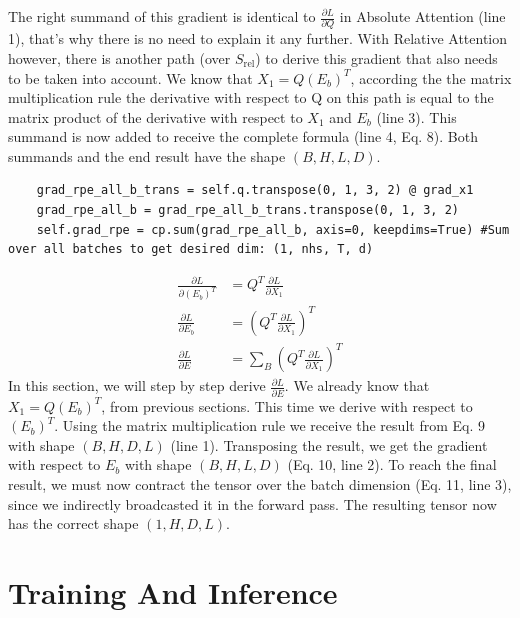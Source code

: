 \documentclass[a4paper,12pt]{extarticle}
\begin{document}
The right summand of this gradient is identical to $\frac{\partial L}{\partial Q}$ in Absolute Attention (line 1), that's why there is no need to explain it any further. With Relative Attention however, there is another path (over $S_\text{rel}$) to derive this gradient that also needs to be taken into account. We know that $X_1 = Q(E_b)^T$, according the the matrix multiplication rule the derivative with respect to Q on this path is equal to the matrix product of the derivative with respect to $X_1$ and $E_b$ (line 3). This summand is now added to receive the complete formula (line 4, Eq. 8). Both summands and the end result have the shape $(B, H, L, D)$.
\newline
\vspace{0.1cm}
\begin{lstlisting}
    grad_rpe_all_b_trans = self.q.transpose(0, 1, 3, 2) @ grad_x1
    grad_rpe_all_b = grad_rpe_all_b_trans.transpose(0, 1, 3, 2)
    self.grad_rpe = cp.sum(grad_rpe_all_b, axis=0, keepdims=True) #Sum over all batches to get desired dim: (1, nhs, T, d)
\end{lstlisting}
\begin{align}
\frac{\partial L}{\partial (E_b)^T}
&= Q^T\frac{\partial L}{\partial X_1} \\[0.2cm]
\frac{\partial L}{\partial E_b}
&= \left(Q^T\frac{\partial L}{\partial X_1}\right)^T \\[0.2cm]
\frac{\partial L}{\partial E}
&= \sum_B\left(Q^T\frac{\partial L}{\partial X_1}\right)^T
\end{align}
In this section, we will step by step derive $\frac{\partial L}{\partial E}$. We already know that  $X_1 = Q(E_b)^T$, from previous sections. This time we derive with respect to $(E_b)^T$. Using the matrix multiplication rule we receive the result from Eq. 9 with shape $(B, H, D, L)$ (line 1). Transposing the result, we get the gradient with respect to $E_b$ with shape $(B, H, L, D)$ (Eq. 10, line 2). To reach the final result, we must now contract the tensor over the batch dimension (Eq. 11, line 3), since we indirectly broadcasted it in the forward pass. The resulting tensor now has the correct shape $(1, H, D, L)$.
\section{Training And Inference}
\end{document}
